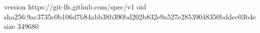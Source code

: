 version https://git-lfs.github.com/spec/v1
oid sha256:9ac3735c0b106d7b84abb38b390bd202b832e9a527e28539048350bddec03b4e
size 349680

